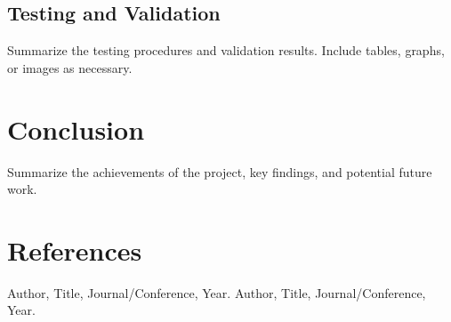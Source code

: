 \documentclass[12pt,a4paper]{article}
\begin{document}
\subsection{Testing and Validation}\label{subsec:testing}
Summarize the testing procedures and validation results. Include tables, graphs, or images as necessary.

\section{Conclusion}\label{sec:conclusion}
Summarize the achievements of the project, key findings, and potential future work. 

\section*{References}
\begin{thebibliography}{99}
     Author, Title, Journal/Conference, Year.
     Author, Title, Journal/Conference, Year.
\end{thebibliography}
\end{document}
